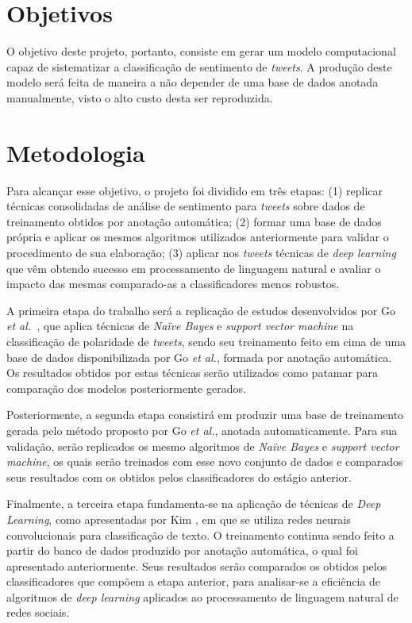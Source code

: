 \section{Objetivos}

O objetivo deste projeto, portanto, consiste em gerar um modelo computacional capaz de sistematizar a classificação de
sentimento de \textit{tweets}.
A produção deste modelo será feita de maneira a não depender de uma base de dados anotada manualmente, visto o alto
custo desta ser reproduzida.

\section{Metodologia}

Para alcançar esse objetivo, o projeto foi dividido em três etapas: (1) replicar técnicas consolidadas de análise de
sentimento para \textit{tweets} sobre dados de treinamento obtidos por anotação automática; (2) formar uma base de dados
própria e aplicar os mesmos algoritmos utilizados anteriormente para validar o procedimento de sua elaboração; (3)
aplicar nos \textit{tweets} técnicas de \textit{deep learning} que vêm obtendo sucesso em processamento de linguagem
natural e avaliar o impacto das mesmas comparado-as a classificadores menos robustos.

A primeira etapa do trabalho será a replicação de estudos desenvolvidos por Go \textit{et al.}~\cite{go09}, que aplica
técnicas de \textit{Naïve Bayes} e \textit{support vector machine} na classificação de polaridade de \textit{tweets},
sendo seu treinamento feito em cima de uma base de dados disponibilizada por Go \textit{et al.}, formada por anotação
automática.
Os resultados obtidos por estas técnicas serão utilizados como patamar para comparação dos modelos posteriormente
gerados.

Posteriormente, a segunda etapa consistirá em produzir uma base de treinamento gerada pelo método proposto por Go
\textit{et al.}, anotada automaticamente.
Para sua validação, serão replicados os mesmo algoritmos de \textit{Naïve Bayes} e \textit{support vector machine},
os quais serão treinados com esse novo conjunto de dados e comparados seus resultados com os obtidos pelos
classificadores do estágio anterior.

Finalmente, a terceira etapa fundamenta-se na aplicação de técnicas de \textit{Deep Learning}, como apresentadas por
Kim \cite{kim14}, em que se utiliza redes neurais convolucionais para classificação de texto.
O treinamento continua sendo feito a partir do banco de dados produzido por anotação automática, o qual foi apresentado
anteriormente.
Seus resultados serão comparados os obtidos pelos classificadores que compõem a etapa anterior, para analisar-se a
eficiência de algoritmos de \textit{deep learning} aplicados ao processamento de linguagem natural de redes sociais.

